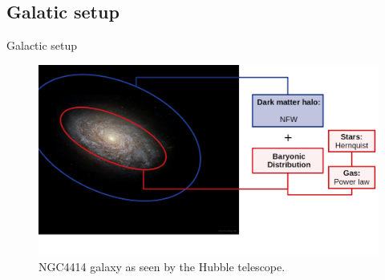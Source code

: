 \documentclass{beamer}
\begin{document}
\subsection{Galatic setup}
\begin{frame}{Galactic setup}
	\begin{figure}[h]
		\centering
		\includegraphics[width=0.8\linewidth]{../Documento/Figures/NGC4414_modified}
		\caption{NGC4414 galaxy as seen by the Hubble telescope.}
	\end{figure}
\end{frame}

%
%		
\end{document}
